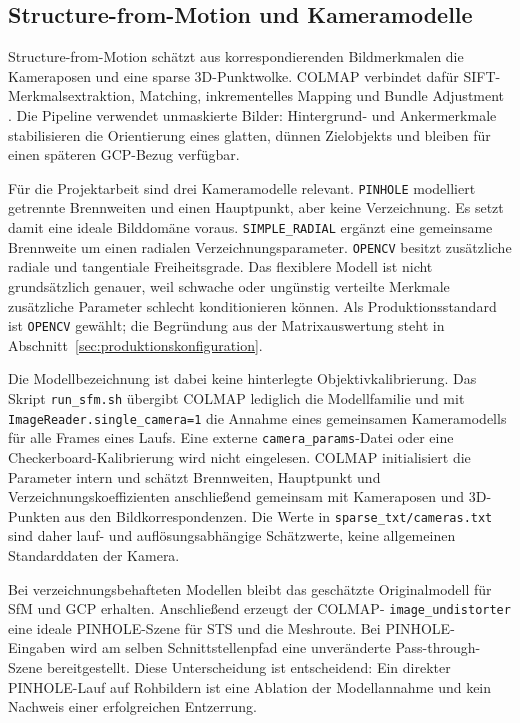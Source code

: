 \subsection{Structure-from-Motion und Kameramodelle}

Structure-from-Motion schätzt aus korrespondierenden Bildmerkmalen die
Kameraposen und eine sparse 3D-Punktwolke. COLMAP verbindet dafür
SIFT-Merkmalsextraktion, Matching, inkrementelles Mapping und Bundle Adjustment
\parencite{schoenberger2016sfm}. Die Pipeline verwendet unmaskierte Bilder:
Hintergrund- und Ankermerkmale stabilisieren die Orientierung eines glatten,
dünnen Zielobjekts und bleiben für einen späteren GCP-Bezug verfügbar.

Für die Projektarbeit sind drei Kameramodelle relevant. \texttt{PINHOLE}
modelliert getrennte Brennweiten und einen Hauptpunkt, aber keine Verzeichnung. Es setzt damit eine
ideale Bilddomäne voraus. \texttt{SIMPLE\_RADIAL} ergänzt eine gemeinsame
Brennweite um einen radialen Verzeichnungsparameter. \texttt{OPENCV} besitzt
zusätzliche radiale und tangentiale Freiheitsgrade. Das flexiblere Modell ist
nicht grundsätzlich genauer, weil schwache oder ungünstig verteilte Merkmale
zusätzliche Parameter schlecht konditionieren können. Als Produktionsstandard
ist \texttt{OPENCV} gewählt; die Begründung aus der Matrixauswertung steht in
Abschnitt~\ref{sec:produktionskonfiguration}.

Die Modellbezeichnung ist dabei keine hinterlegte Objektivkalibrierung. Das
Skript \texttt{run\_sfm.sh} übergibt COLMAP lediglich die Modellfamilie und mit
\texttt{ImageReader.single\_camera=1} die Annahme eines gemeinsamen
Kameramodells für alle Frames eines Laufs. Eine externe
\texttt{camera\_params}-Datei oder eine Checkerboard-Kalibrierung wird nicht
eingelesen. COLMAP initialisiert die Parameter intern und schätzt Brennweiten,
Hauptpunkt und Verzeichnungskoeffizienten anschließend gemeinsam mit
Kameraposen und 3D-Punkten aus den Bildkorrespondenzen. Die Werte in
\texttt{sparse\_txt/cameras.txt} sind daher lauf- und auflösungsabhängige
Schätzwerte, keine allgemeinen Standarddaten der Kamera.

Bei verzeichnungsbehafteten Modellen bleibt das geschätzte Originalmodell für
SfM und GCP erhalten. Anschließend erzeugt der COLMAP-
\texttt{image\_undistorter} eine ideale PINHOLE-Szene für STS und die
Meshroute. Bei PINHOLE-Eingaben wird am selben Schnittstellenpfad eine
unveränderte Pass-through-Szene bereitgestellt. Diese Unterscheidung ist
entscheidend: Ein direkter PINHOLE-Lauf auf Rohbildern ist eine Ablation der
Modellannahme und kein Nachweis einer erfolgreichen Entzerrung.


